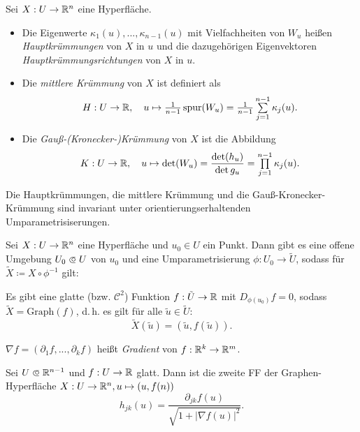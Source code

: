 \documentclass{cheat-sheet}
\newcommand{\Graph}{\mathrm{Graph}}
\begin{document}
\begin{definition}
  Sei $X : U \to \mathbb{R}^n$ eine Hyperfläche.
  \begin{itemize}
    \item Die Eigenwerte $\kappa_1(u), ..., \kappa_{n-1}(u)$ mit Vielfachheiten von $W_u$ heißen \emph{Hauptkrümmungen} von $X$ in $u$ und die dazugehörigen Eigenvektoren \emph{Hauptkrümmungsrichtungen} von $X$ in $u$.
    \item Die \emph{mittlere Krümmung} von $X$ ist definiert als
    \[ H : U \to \R, \quad u \mapsto \tfrac{1}{n-1} \, \spur(W_u) = \tfrac{1}{n-1} \sum_{j=1}^{n-1} \kappa_j(u). \]
    \item Die \emph{Gauß-(Kronecker-)Krümmung} von $X$ ist die Abbildung
    \[ K : U \to \R, \quad u \mapsto \det(W_u) = \frac{\det(h_u)}{\det{g_u}} = \prod_{j=1}^{n-1} \kappa_j(u). \]
  \end{itemize}
\end{definition}

\begin{satz}
  Die Hauptkrümmungen, die mittlere Krümmung und die Gauß-Kronecker-Krümmung sind invariant unter orientierungserhaltenden Umparametrisiserungen.
\end{satz}


\begin{satz}
  Sei $X : U \to \mathbb{R}^n$ eine Hyperfläche und $u_0 \in U$ ein Punkt. Dann gibt es eine offene Umgebung $U_0 \opn U$ von $u_0$ und eine Umparametrisierung $\phi : U_0 \to \tilde{U}$, sodass für $\tilde{X} \coloneqq X \circ \phi^{-1}$ gilt:

  Es gibt eine glatte (bzw. $\mathcal{C}^2$) Funktion $f : \tilde{U} \to \mathbb{R}$ mit $D_{\phi(u_0)} f = 0$, sodass $\tilde{X} = \Graph(f)$, d.\,h. es gilt für alle $\tilde{u} \in \tilde{U}$:
  \[ \tilde{X}(\tilde{u}) = (\tilde{u}, f(\tilde{u})). \]
\end{satz}

\begin{nota}
  $\nabla f = (\partial_1 f, ..., \partial_k f)$ heißt \emph{Gradient} von $f : \mathbb{R}^k \to \mathbb{R}^m$.
\end{nota}

\begin{satz}
  Sei $U \opn \R^{n-1}$ und $f : U \to \mathbb{R}$ glatt. Dann ist die zweite FF der Graphen-Hyperfläche $X : U \to \mathbb{R}^n, u \mapsto (u, f(n))$
  \[ h_{jk}(u) = \frac{\partial_{jk} f(u)}{\sqrt{1 + |\nabla f(u)|^2}}. \]
\end{satz}
\end{document}
